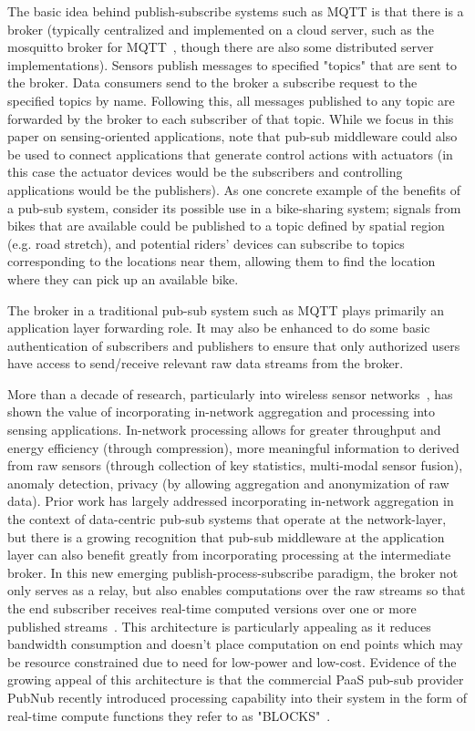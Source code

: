 The basic idea behind publish-subscribe systems such as MQTT is that there is a
broker (typically centralized and implemented on a cloud server, such as the
mosquitto broker for MQTT~\cite{light2013mosquitto}, though there are also some
distributed server implementations). Sensors publish messages to specified
"topics" that are sent to the broker. Data consumers send to the broker a
subscribe request to the specified topics by name. Following this, all messages
published to any topic are forwarded by the broker to each subscriber of that
topic. While we focus in this paper on sensing-oriented applications, note that
pub-sub middleware could also be used to connect applications that generate
control actions with actuators (in this case the actuator devices would be the
subscribers and controlling applications would be the publishers). As one
concrete example of the benefits of a pub-sub system, consider its possible use
in a bike-sharing system; signals from bikes that are available could be
published to a topic defined by spatial region (e.g. road stretch), and
potential riders' devices can subscribe to topics corresponding to the
locations near them, allowing them to find the location where they can pick up
an available bike.

The broker in a traditional pub-sub system such as MQTT plays primarily an
application layer forwarding role. It may also be enhanced to do some basic
authentication of subscribers and publishers to ensure that only authorized
users have access to send/receive relevant raw data streams from the broker. 

More than a decade of research, particularly into  wireless sensor
networks~\cite{yao2002cougar, krishnamachari2002impact}, has shown the value of
incorporating in-network aggregation and processing into sensing applications.
In-network processing allows for greater throughput and energy efficiency
(through compression), more meaningful information to derived from raw sensors
(through collection of key statistics, multi-modal sensor fusion), anomaly
detection, privacy (by allowing aggregation and anonymization of raw data).
Prior work has largely addressed incorporating in-network aggregation in the
context of data-centric pub-sub systems that operate at the network-layer, but
there is a growing recognition that pub-sub middleware at the application layer
can also benefit greatly from incorporating processing at the intermediate
broker. In this new emerging  publish-process-subscribe paradigm, the broker
not only serves as a relay, but also enables computations over the raw streams
so that the end subscriber receives real-time computed versions over one or
more published streams~\cite{kwame17}. This architecture is particularly
appealing as it reduces bandwidth consumption and doesn't place computation on
end points which may be resource constrained due to need for low-power and
low-cost. Evidence of the growing appeal of this architecture is that the
commercial PaaS pub-sub provider PubNub recently introduced processing
capability into their system in the form of real-time compute functions they
refer to as "BLOCKS"~\cite{blocks}.

